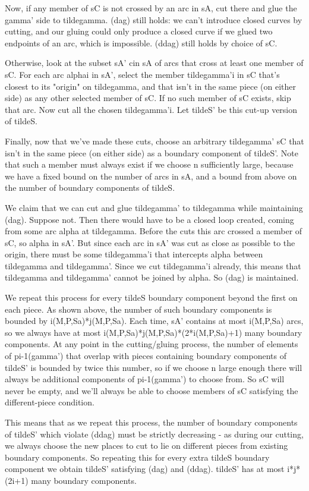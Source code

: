 \documentclass[12pt]{amsart}
\theoremstyle{definition}
\theoremstyle{remark}
\begin{document}
Now, if any member of sC is not crossed by an arc in sA, cut there and glue the
gamma' side to tildegamma. (dag) still holds: we can't introduce closed curves
by cutting, and our gluing could only produce a closed curve if we glued two
endpoints of an arc, which is impossible. (ddag) still holds by choice of sC.

Otherwise, look at the subset sA' cin sA of arcs that cross at least one member
of sC. For each arc alphai in sA', select the member tildegamma'i in sC that's
closest to its "origin" on tildegamma, and that isn't in the same piece (on
either side) as any other selected member of sC. If no such member of sC
exists, skip that arc.  Now cut all the chosen tildegamma'i. Let tildeS' be
this cut-up version of tildeS.

Finally, now that we've made these cuts, choose an arbitrary tildegamma' sC
that isn't in the same piece (on either side) as a boundary component of
tildeS'.  Note that such a member must always exist if we choose n sufficiently
large, because we have a fixed bound on the number of arcs in sA, and a bound
from above on the number of boundary components of tildeS.

We claim that we can cut and glue tildegamma' to tildegamma while maintaining
(dag).  Suppose not. Then there would have to be a closed loop created, coming
from some arc alpha at tildegamma. Before the cuts this arc crossed a member of
sC, so alpha in sA'. But since each arc in sA' was cut as close as possible to
the origin, there must be some tildegamma'i that intercepts alpha between
tildegamma and tildegamma'. Since we cut tildegamma'i already, this means that
tildegamma and tildegamma' cannot be joined by alpha. So (dag) is maintained.

We repeat this process for every tildeS boundary component beyond the first on
each piece. As shown above, the number of such boundary components is bounded
by i(M,P,Sa)*j(M,P,Sa). Each time, sA' contains at most i(M,P,Sa) arcs, so we
always have at most i(M,P,Sa)*j(M,P,Sa)*(2*i(M,P,Sa)+1) many boundary
components.  At any point in the cutting/gluing process, the number of elements
of pi-1(gamma') that overlap with pieces containing boundary components of
tildeS' is bounded by twice this number, so if we choose n large enough there
will always be additional components of pi-1(gamma') to choose from. So sC will
never be empty, and we'll always be able to choose members of sC satisfying the
different-piece condition.

This means that as we repeat this process, the number of boundary components of
tildeS' which violate (ddag) must be strictly decreasing - as during our
cutting, we always choose the new places to cut to lie on different pieces from
existing boundary components. So repeating this for every extra tildeS boundary
component we obtain tildeS' satisfying (dag) and (ddag). tildeS' has at most
i*j*(2i+1) many boundary components.
\end{document}
